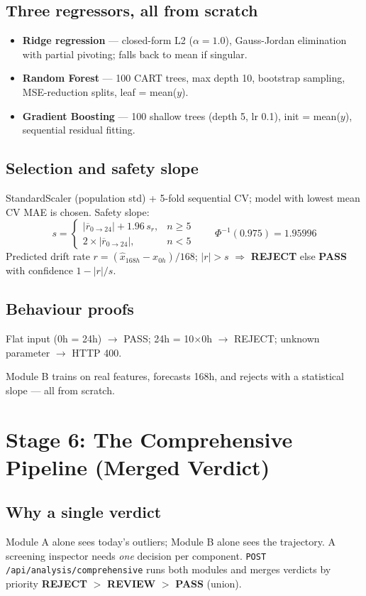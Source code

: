 \documentclass[11pt,a4paper]{article}
\newcommand{\code}[1]{\texttt{\small #1}}
\newcommand{\keys}[1]{\textbf{\sffamily#1}}
\newcommand{\milestone}[1]{\par\vspace{0.6em}\noindent
  \begin{tcolorbox}[colback=solgreen!8,colframe=solgreen,
    title={\sffamily\bfseries\color{white}Milestone},arc=2pt,boxrule=1pt]
    #1
  \end{tcolorbox}\par\vspace{0.4em}}
\begin{document}
\subsection*{Three regressors, all from scratch}
\begin{itemize}[leftmargin=1.5em]
  \item \textbf{Ridge regression} --- closed-form L2 ($\alpha=1.0$), Gauss-Jordan elimination with
        partial pivoting; falls back to mean if singular.
  \item \textbf{Random Forest} --- 100 CART trees, max depth 10, bootstrap sampling, MSE-reduction
        splits, leaf = mean($y$).
  \item \textbf{Gradient Boosting} --- 100 shallow trees (depth 5, lr 0.1), init = mean($y$),
        sequential residual fitting.
\end{itemize}

\subsection*{Selection and safety slope}
StandardScaler (population std) + 5-fold sequential CV; model with lowest mean CV MAE is chosen.
Safety slope:
\[
s =
\begin{cases}
|\overline{r}_{0\rightarrow24}|+1.96\,s_r, & n\ge 5\\
2\times|\overline{r}_{0\rightarrow24}|, & n<5
\end{cases}
\qquad \Phi^{-1}(0.975)=1.95996
\]
Predicted drift rate $r=(\hat{x}_{168h}-x_{0h})/168$; $|r|>s$ $\Rightarrow$ \keys{REJECT} else
\keys{PASS} with confidence $1-|r|/s$.

\subsection*{Behaviour proofs}
Flat input (0h = 24h) $\rightarrow$ PASS; 24h = 10$\times$0h $\rightarrow$ REJECT; unknown parameter
$\rightarrow$ HTTP 400.

\milestone{Module B trains on real features, forecasts 168h, and rejects with a statistical
  slope --- all from scratch.}

\section{Stage 6: The Comprehensive Pipeline (Merged Verdict)}

\subsection*{Why a single verdict}
Module A alone sees today's outliers; Module B alone sees the trajectory. A screening inspector
needs \emph{one} decision per component. \code{POST /api/analysis/comprehensive} runs both modules
and merges verdicts by priority \keys{REJECT} $>$ \keys{REVIEW} $>$ \keys{PASS} (union).
\end{document}
